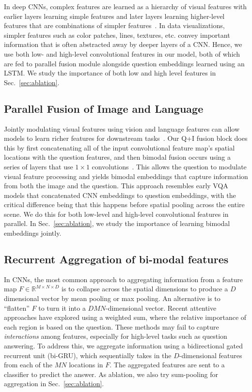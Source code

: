 \documentclass[10pt,twocolumn]{article}
\begin{document}
In deep CNNs, complex features are learned as a hierarchy of visual features with earlier layers learning simple features and later layers learning higher-level features that are combinations of simpler features~\cite{yosinski2015understanding}. In data visualizations, simpler features such as color patches, lines, textures, etc. convey important information that is often abstracted away by deeper layers of a CNN. Hence, we use both low- and high-level convolutional features in our model, both of which are fed to parallel fusion module alongside question embeddings learned using an LSTM. We study the importance of both low and high level features in Sec.~\ref{sec:ablation}.

\subsection{Parallel Fusion of Image and Language} Jointly modulating visual features using  vision and language features can allow models to learn richer features for downstream tasks~\cite{malinowski2018visual,perez2018film,shrestha2019ramen}. Our Q+I fusion block does this by first concatenating all of the input convolutional feature map's spatial locations with the question features, and then bimodal fusion occurs using a series of layers that use $1 \times 1$  convolutions~\cite{malinowski2018visual,shrestha2019ramen}. This allows the question to modulate visual feature processing and yields bimodal embeddings that capture information from both the image and the question. This approach resembles early VQA models that concatenated CNN embeddings to question embeddings, with the critical difference being that this happens before spatial pooling across the entire scene. We do this for both low-level and high-level convolutional features in parallel. In Sec.~\ref{sec:ablation}, we study the importance of learning bimodal embeddings jointly. 

\subsection{Recurrent Aggregation of bi-modal features} 
 In CNNs, the most common approach to aggregating information from a feature map $F \in \mathbb{R}^{M\times N \times D}$ is to collapse across the spatial dimensions to produce a $D$ dimensional vector by mean pooling or max pooling. An alternative is to ``flatten'' $F$ to turn it into a $DMN$-dimensional vector. Recent attentive approaches have  explored using a weighted sum, where the relative importance of each region is based on the question. These methods may fail to  capture \textit{interactions} among features, especially for high-level tasks such as question answering. To address this, we aggregate information using a bidirectional gated recurrent unit (bi-GRU), which sequentially takes in the $D$-dimensional features from each of the $MN$ locations in $F$. The aggregated features are sent to a classifier to predict the answer. As ablation, we also try sum-pooling for aggregation in Sec.~\ref{sec:ablation}.
\end{document}
